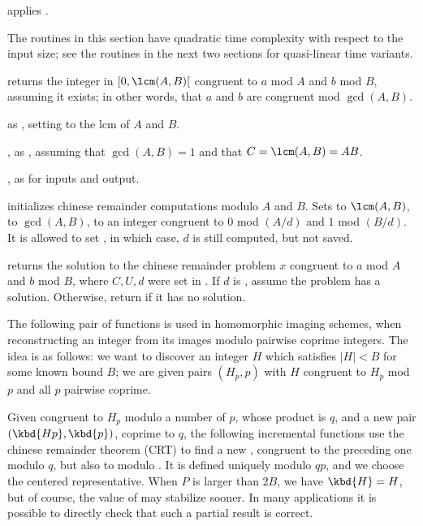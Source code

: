  applies .

The routines in this section have quadratic time complexity with respect to
the input size; see the routines in the next two sections for quasi-linear
time variants.

 returns the integer
in $[0, \lcm(A,B)[$ congruent to $a$ mod $A$ and $b$ mod $B$, assuming it
exists; in other words, that $a$ and $b$ are congruent mod $\gcd(A,B)$.

 as
, setting  to the lcm of $A$ and $B$.

, as
, assuming that $\gcd(A,B) = 1$ and that $C = \lcm(A,B) = AB$.

, as
 for  inputs and output.

initializes chinese remainder computations modulo $A$ and $B$. Sets
 to $\lcm(A,B)$,  to $\gcd(A,B)$,
 to an integer congruent to $0$ mod $(A/d)$ and $1$ mod $(B/d)$.
It is allowed to set , in which case, $d$ is still
computed, but not saved.

 returns
the solution to the chinese remainder problem $x$ congruent
to $a$ mod $A$ and $b$ mod $B$, where $C, U, d$ were set in
. If $d$ is , assume the problem has a
solution. Otherwise, return  if it has no solution.

\medskip

The following pair of functions is used in homomorphic imaging schemes,
when reconstructing an integer from its images modulo pairwise coprime
integers. The idea is as follows: we want to discover an integer $H$ which
satisfies $|H| < B$ for some known bound $B$; we are given pairs $(H_p, p)$
with $H$ congruent to $H_p$ mod $p$ and all $p$ pairwise coprime.

Given  congruent to $H_p$ modulo a number of $p$, whose product is
$q$, and a new pair $(\kbd{Hp}, \kbd{p})$,  coprime to $q$, the
following incremental functions use the chinese remainder theorem (CRT) to
find a new , congruent to the preceding one modulo $q$, but also to
 modulo . It is defined uniquely modulo $qp$, and we choose
the centered representative. When $P$ is larger than $2B$, we have $\kbd{H} =
H$, but of course, the value of  may stabilize sooner. In many
applications it is possible to directly check that such a partial result is
correct.


